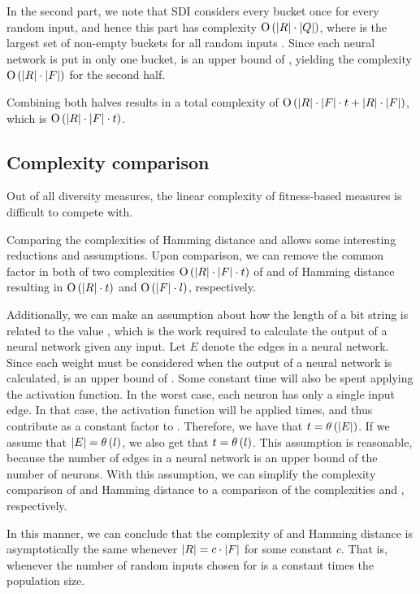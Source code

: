 In the second part, we note that SDI considers every bucket once for every random input, and hence this part has complexity $\operatorname{O}\left(\lvert R\rvert\cdot\lvert Q\rvert\right)$, where \nemptyspeciesset{} is the largest set of non-empty buckets for all random inputs \ranset. Since each neural network is put in only one bucket, \indsetl{} is an upper bound of \nemptyspeciessetl, yielding the complexity $\operatorname{O}\left(\lvert R\rvert\cdot\lvert F\rvert\right)$ for the second half.

Combining both halves results in a total complexity of $\operatorname{O}\left(\lvert R\rvert \cdot \lvert F\rvert \cdot t + \lvert R\rvert \cdot \lvert F\rvert\right)$, which is $\operatorname{O}\left(\lvert R\rvert\cdot\lvert F\rvert\cdot t\right)$.

\subsection{Complexity comparison}
Out of all diversity measures, the linear complexity of fitness-based measures is difficult to compete with.

Comparing the complexities of Hamming distance and \dia{} allows some interesting reductions and assumptions. Upon comparison, we can remove the common factor \indset{} in both of two complexities $\operatorname{O}\left(\lvert R\rvert\cdot\lvert F\rvert\cdot t\right)$ of \dia{} and \bigO{\indsetl^2 \cdot \bitstringl} of Hamming distance resulting in $\operatorname{O}\left(\lvert R\rvert \cdot t\right)$ and $\operatorname{O}\left(\lvert F\rvert \cdot l\right)$, respectively. 

Additionally, we can make an assumption about how the length of a bit string \bitstringl{} is related to the value \timet, which is the work required to calculate the output of a neural network given any input. Let $E$ denote the edges in a neural network. Since each weight must be considered when the output of a neural network is calculated,  is an upper bound of \timet. Some constant time will also be spent applying the activation function. In the worst case, each neuron has only a single input edge. In that case, the activation function will be applied  times, and thus contribute as a constant factor to \timet. Therefore, we have that $t = \theta\left(\lvert E\rvert\right)$. If we assume that $\lvert E\rvert = \theta\left(l\right)$, we also get that $t = \theta\left(l\right)$. This assumption is reasonable, because the number of edges in a neural network is an upper bound of the number of neurons. With this assumption, we can simplify the complexity comparison of \dia{} and Hamming distance to a comparison of the complexities \bigO{\ransetl} and \bigO{\indsetl}, respectively.

In this manner, we can conclude that the complexity of \dia{} and Hamming distance is asymptotically the same whenever $\lvert R\rvert = c \cdot \lvert F\rvert$ for some constant $c$. That is, whenever the number of random inputs chosen for \dia{} is a constant times the population size.
